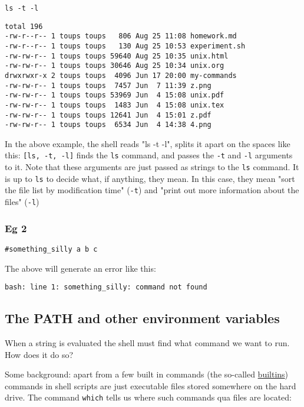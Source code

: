 \documentclass[11pt]{article}
\begin{document}
\begin{verbatim}
ls -t -l
\end{verbatim}

\begin{verbatim}
total 196
-rw-r--r-- 1 toups toups   806 Aug 25 11:08 homework.md
-rw-r--r-- 1 toups toups   130 Aug 25 10:53 experiment.sh
-rw-rw-r-- 1 toups toups 59640 Aug 25 10:35 unix.html
-rw-rw-r-- 1 toups toups 30646 Aug 25 10:34 unix.org
drwxrwxr-x 2 toups toups  4096 Jun 17 20:00 my-commands
-rw-rw-r-- 1 toups toups  7457 Jun  7 11:39 z.png
-rw-rw-r-- 1 toups toups 53969 Jun  4 15:08 unix.pdf
-rw-rw-r-- 1 toups toups  1483 Jun  4 15:08 unix.tex
-rw-rw-r-- 1 toups toups 12641 Jun  4 15:01 z.pdf
-rw-rw-r-- 1 toups toups  6534 Jun  4 14:38 4.png
\end{verbatim}

In the above example, the shell reads "ls -t -l", splits it apart on
the spaces like this: \texttt{[ls, -t, -l]} finds the \texttt{ls} command, and
passes the \texttt{-t} and \texttt{-l} arguments to it. Note that these arguments
are just passed as strings to the \texttt{ls} command. It is up to \texttt{ls} to
decide what, if anything, they mean. In this case, they mean "sort the
file list by modification time" (\texttt{-t}) and "print out more information
about the files" (\texttt{-l})

\subsubsection{Eg 2}
\label{sec:org6bf3b0c}

\begin{verbatim}
#something_silly a b c
\end{verbatim}

The above will generate an error like this:

\begin{verbatim}
bash: line 1: something_silly: command not found
\end{verbatim}

\subsection{The PATH and other environment variables}
\label{sec:org0d07484}

When a string is evaluated the shell must find what command we want to
run. How does it do so? 

Some background: apart from a few built in commands (the so-called
\href{https://www.gnu.org/software/bash/manual/html\_node/Bash-Builtins.html}{builtins}) commands in shell scripts are just executable files stored
somewhere on the hard drive.  The command \texttt{which} tells us where such
commands qua files are located:
\end{document}
